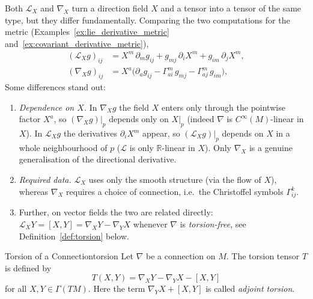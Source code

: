 



\begin{colremark}
Both $\mathcal{L}_X$ and $\nabla_X$ turn a direction field $X$ and a tensor into a tensor of the same type, but they differ fundamentally. Comparing the two computations for the metric (Examples~\ref{ex:lie_derivative_metric} and~\ref{ex:covariant_derivative_metric}),
\begin{align*}
(\mathcal{L}_X g)_{ij} &= X^m\,\partial_m g_{ij} + g_{mj}\,\partial_i X^m + g_{im}\,\partial_j X^m, \\
(\nabla_X g)_{ij} &= X^a\big(\partial_a g_{ij} - \Gamma^m_{ai}\,g_{mj} - \Gamma^m_{aj}\,g_{im}\big),
\end{align*}
Some differences stand out:
\begin{enumerate}[itemsep=0pt, topsep=0pt]
    \item \emph{Dependence on $X$.} In $\nabla_X g$ the field $X$ enters only through the pointwise factor $X^a$, so $(\nabla_X g)|_p$ depends only on $X|_p$ (indeed $\nabla$ is $C^\infty(M)$-linear in $X$). In $\mathcal{L}_X g$ the derivatives $\partial_i X^m$ appear, so $(\mathcal{L}_X g)|_p$ depends on $X$ in a whole neighbourhood of $p$ ($\mathcal{L}$ is only $\mathbb{R}$-linear in $X$). Only $\nabla_X$ is a genuine generalisation of the directional derivative.
    \item \emph{Required data.} $\mathcal{L}_X$ uses only the smooth structure (via the flow of $X$), whereas $\nabla_X$ requires a choice of connection, i.e.\ the Christoffel symbols $\Gamma^k_{ij}$.
    \item Further, on vector fields the two are related directly: $\mathcal{L}_X Y = [X,Y] = \nabla_X Y - \nabla_Y X$ whenever $\nabla$ is \emph{torsion-free}, see Definition~\ref{def:torsion} below.
\end{enumerate}
\end{colremark}





\begin{colordef}{Torsion of a Connection}{torsion}
Let $\nabla$ be a connection on $M$. The torsion tensor $T$ is defined by
\[
T(X, Y) = \nabla_X Y - \nabla_Y X - [X, Y]
\]
for all $X, Y \in \Gamma(TM)$. Here the term $\nabla_Y X + [X, Y]$ is called \emph{adjoint torsion}.
\end{colordef}

